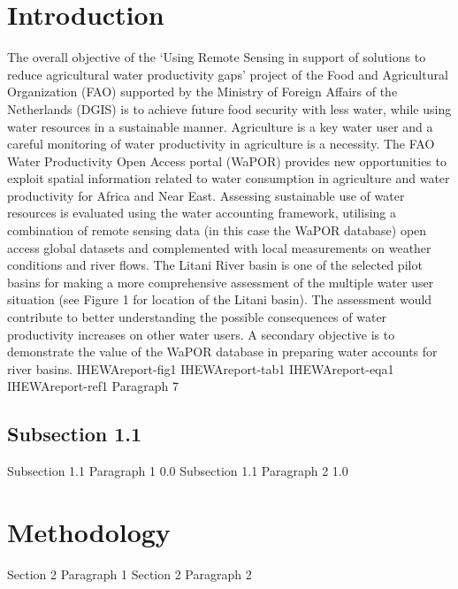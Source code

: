 \documentclass{article}%
\begin{document}
\section{Introduction}%
\label{sec:Introduction}%
The overall objective of the ‘Using Remote Sensing in support of solutions to reduce agricultural water productivity gaps’ project of the Food and Agricultural Organization (FAO) supported by the Ministry of Foreign Affairs of the Netherlands (DGIS) is to achieve future food security with less water, while using water resources in a sustainable manner. Agriculture is a key water user and a careful monitoring of water productivity in agriculture is a necessity. The FAO Water Productivity Open Access portal (WaPOR) provides new opportunities to exploit spatial information related to water consumption in agriculture and water productivity for Africa and Near East. Assessing sustainable use of water resources is evaluated using the water accounting framework, utilising a combination of remote sensing data (in this case the WaPOR database) open access global datasets and complemented with local measurements on weather conditions and river flows.%
\linebreak%
The Litani River basin is one of the selected pilot basins for making a more comprehensive assessment of the multiple water user situation (see Figure 1 for location of the Litani basin). The assessment would contribute to better understanding the possible consequences of water productivity increases on other water users. A secondary objective is to demonstrate the value of the WaPOR database in preparing water accounts for river basins.%
\linebreak%
IHEWAreport{-}fig1%
\linebreak%
IHEWAreport{-}tab1%
\linebreak%
IHEWAreport{-}eqa1%
\linebreak%
IHEWAreport{-}ref1%
\linebreak%
Paragraph 7%
\linebreak%
\subsection{Subsection 1.1}%
\label{subsec:Subsection1.1}%
Subsection 1.1 Paragraph 1 0.0%
\linebreak%
Subsection 1.1 Paragraph 2 1.0%
\linebreak

%
\newpage%
\RaggedRight%
\section{Methodology}%
\label{sec:Methodology}%
Section 2 Paragraph 1%
\linebreak%
Section 2 Paragraph 2%
\linebreak%
\end{document}

